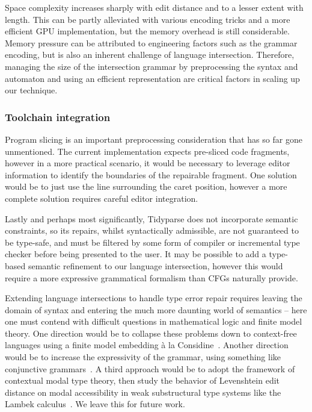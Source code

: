 \documentclass[popl.tex]{subfiles}
\begin{document}
Space complexity increases sharply with edit distance and to a lesser extent with length. This can be partly alleviated with various encoding tricks and a more efficient GPU implementation, but the memory overhead is still considerable. Memory pressure can be attributed to engineering factors such as the grammar encoding, but is also an inherent challenge of language intersection. Therefore, managing the size of the intersection grammar by preprocessing the syntax and automaton and using an efficient representation are critical factors in scaling up our technique.

\subsubsection{Toolchain integration}

Program slicing is an important preprocessing consideration that has so far gone unmentioned. The current implementation expects pre-sliced code fragments, however in a more practical scenario, it would be necessary to leverage editor information to identify the boundaries of the repairable fragment. One solution would be to just use the line surrounding the caret position, however a more complete solution requires careful editor integration.

Lastly and perhaps most significantly, Tidyparse does not incorporate semantic constraints, so its repairs, whilst syntactically admissible, are not guaranteed to be type-safe, and must be filtered by some form of compiler or incremental type checker before being presented to the user. It may be possible to add a type-based semantic refinement to our language intersection, however this would require a more expressive grammatical formalism than CFGs naturally provide.

Extending language intersections to handle type error repair requires leaving the domain of syntax and entering the much more daunting world of semantics -- here one must contend with difficult questions in mathematical logic and finite model theory. One direction would be to collapse these problems down to context-free languages using a finite model embedding \`a la Considine~\cite{considine2025word}. Another direction would be to increase the expressivity of the grammar, using something like conjunctive grammars~\cite{okhotin2001conjunctive}. A third approach would be to adopt the framework of contextual modal type theory, then study the behavior of Levenshtein edit distance on modal accessibility in weak substructural type systems like the Lambek calculus~\cite{pshenitsyn2025first}. We leave this for future work.
\ifSubfilesClassLoaded{\par\clearpage}{}
\end{document}

